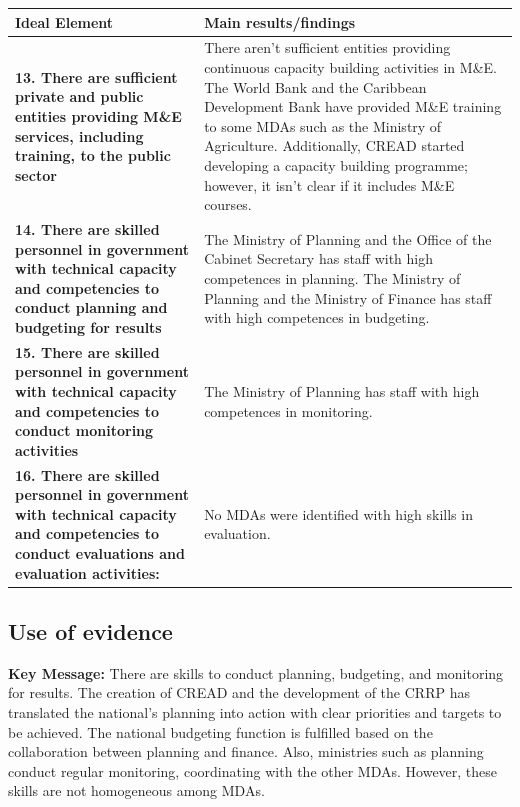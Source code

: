 \documentclass[
  10pt,
]{book}
\begin{document}
\begingroup\fontsize{12}{14}\selectfont

\begin{tabu} to 
\hline
Ideal Element & Main results/findings\\
\hline
\textbf{13. There are sufficient private and public entities providing M\&E services, including training, to the public sector} & There aren’t sufficient entities providing continuous capacity building activities in M\&E. The World Bank and the Caribbean Development Bank have provided M\&E training to some MDAs such as the Ministry of Agriculture. Additionally, CREAD started developing a capacity building programme; however, it isn’t clear if it includes M\&E courses.\\
\hline
\textbf{14. There are skilled personnel in government with technical capacity and competencies to conduct planning and budgeting for results} & The Ministry of Planning and the Office of the Cabinet Secretary has staff with high competences in planning. The Ministry of Planning and the Ministry of Finance has staff with high competences in budgeting.\\
\hline
\textbf{15. There are skilled personnel in government with technical capacity and competencies to conduct monitoring activities} & The Ministry of Planning has staff with high competences in monitoring.\\
\hline
\textbf{16. There are skilled personnel in government with technical capacity and competencies to conduct evaluations and evaluation activities:} & No MDAs were identified with high skills in evaluation.\\
\hline
\end{tabu}
\endgroup{}

\hypertarget{use-of-evidence}{%
\subsection{Use of evidence}\label{use-of-evidence}}

\textbf{Key Message:}
There are skills to conduct planning, budgeting, and monitoring for results. The creation of CREAD and the development of the CRRP has translated the national's planning into action with clear priorities and targets to be achieved. The national budgeting function is fulfilled based on the collaboration between planning and finance. Also, ministries such as planning conduct regular monitoring, coordinating with the other MDAs. However, these skills are not homogeneous among MDAs.
\end{document}
